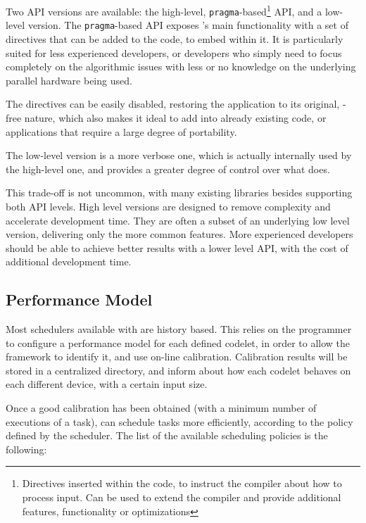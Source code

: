 \documentclass[main.tex]{subfiles}
\begin{document}
Two API versions are available: the high-level, \texttt{pragma}-based\footnote{Directives inserted within the code, to instruct the compiler about how to process input. Can be used to extend the compiler and provide additional features, functionality or optimizations} API, and a low-level version. The \texttt{pragma}-based API exposes \starpu's main functionality with a set of directives that can be added to the code, to embed \starpu within it. It is particularly suited for less experienced developers, or developers who simply need to focus completely on the algorithmic issues with less or no knowledge on the underlying parallel hardware being used.

The directives can be easily disabled, restoring the application to its original, \starpu-free nature, which also makes it ideal to add \starpu into already existing code, or applications that require a large degree of portability.

The low-level version is a more verbose one, which is actually internally used by the high-level one, and provides a greater degree of control over what \starpu does.

This trade-off is not uncommon, with many existing libraries besides \starpu supporting both API levels. High level versions are designed to remove complexity and accelerate development time. They are often a subset of an underlying low level version, delivering only the more common features. More experienced developers should be able to achieve better results with a lower level API, with the cost of additional development time.

\subsection{Performance Model}

Most schedulers available with \starpu are history based. This relies on the programmer to configure a performance model for each defined codelet, in order to allow the framework to identify it, and use on-line calibration. Calibration results will be stored in a centralized directory, and inform \starpu about how each codelet behaves on each different device, with a certain input size.

Once a good calibration has been obtained (with a minimum number of executions of a task), \starpu can schedule tasks more efficiently, according to the policy defined by the scheduler. The list of the available scheduling policies is the following:
\end{document}
